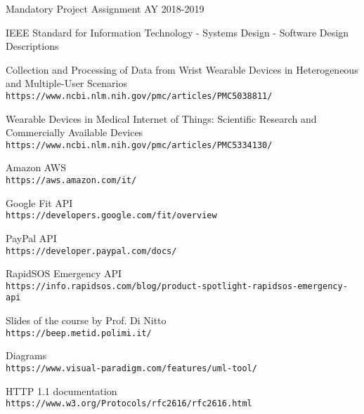 \documentclass[../DD0.tex]{subfiles}
\begin{document}
\begin{thebibliography}{9}
   Mandatory Project Assignment AY 2018-2019

   IEEE Standard for Information Technology - Systems Design - Software Design Descriptions

   Collection and Processing of Data from Wrist Wearable Devices in Heterogeneous and Multiple-User Scenarios\\
  \texttt{https://www.ncbi.nlm.nih.gov/pmc/articles/PMC5038811/}

   Wearable Devices in Medical Internet of Things: Scientific Research and Commercially Available Devices\\
  \texttt{https://www.ncbi.nlm.nih.gov/pmc/articles/PMC5334130/}

  Amazon AWS\\
  \texttt{https://aws.amazon.com/it/}

   Google Fit API\\
  \texttt{https://developers.google.com/fit/overview}

   PayPal API\\
  \texttt{https://developer.paypal.com/docs/}

   RapidSOS Emergency API\\
  \texttt{https://info.rapidsos.com/blog/product-spotlight-rapidsos-emergency-api}

  Slides of the course by Prof. Di Nitto\\
  \texttt{https://beep.metid.polimi.it/}

  Diagrams\\
  \texttt{https://www.visual-paradigm.com/features/uml-tool/}

  HTTP 1.1 documentation\\
  \texttt{https://www.w3.org/Protocols/rfc2616/rfc2616.html}

  


\end{thebibliography}
\end{document}

